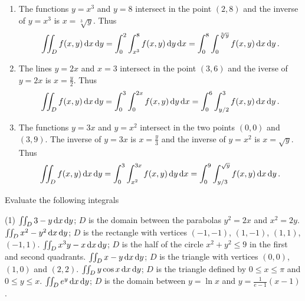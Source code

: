\begin{solution}
\begin{enumerate}
\item
The functions $y=x^3$ and $y=8$ intersect in the point $(2,8)$ and the inverse of $y=x^3$ is $x=\sqrt[3]{y}$. Thus
\[
\iint_D f(x,y) \,\mathrm{d} x \,\mathrm{d} y
= \int_0^2 \int_{x^3}^8 f(x,y) \,\mathrm{d} y \,\mathrm{d} x
= \int_0^8 \int_0^{\sqrt[3]{y}} f(x,y) \,\mathrm{d} x \,\mathrm{d} y\,.
\]
\item
The lines $y=2x$ and $x=3$ intersect in the point $(3,6)$ and the iverse of $y=2x$ is $x=\frac y2$. Thus
\[
\iint_D f(x,y) \,\mathrm{d} x \,\mathrm{d} y
= \int_0^3 \int_0^{2x} f(x,y) \,\mathrm{d} y \,\mathrm{d} x
= \int_0^6 \int_{y/2}^3 f(x,y) \,\mathrm{d} x \,\mathrm{d} y\,.
\]
\item
The functions $y=3x$ and $y=x^2$ intersect in the two points $(0,0)$ and $(3,9)$. The inverse of $y=3x$ is $x=\frac y3$ and the inverse of $y=x^2$ is $x=\sqrt y$. Thus
\[
\iint_D f(x,y) \,\mathrm{d} x \,\mathrm{d} y
= \int_0^3 \int_{x^2}^{3x} f(x,y) \,\mathrm{d} y \,\mathrm{d} x
= \int_0^9 \int_{y/3}^{\sqrt y} f(x,y) \,\mathrm{d} x \,\mathrm{d} y\,.
\]
\end{enumerate}
\end{solution}

\begin{question}
Evaluate the following integrals
\begin{tasks}(1)
\task
$\iint_D 3-y \,\mathrm{d} x \,\mathrm{d} y$; $D$ is the domain between the parabolas $y^2=2x$ and $x^2=2y$.
\task
$\iint_D x^2-y^2 \,\mathrm{d} x \,\mathrm{d} y$; $D$ is the rectangle with vertices $(-1,-1)$, $(1,-1)$, $(1,1)$, $(-1,1)$.
\task
$\iint_D x^3y - x \,\mathrm{d} x \,\mathrm{d} y$; $D$ is the half of the circle $x^2 + y^2 \leq 9$ in the first and second quadrants.
\task
$\iint_D x-y \,\mathrm{d} x \,\mathrm{d} y$; $D$ is the triangle with vertices $(0,0)$, $(1,0)$ and $(2,2)$.
\task
$\iint_D y \cos x \,\mathrm{d} x \,\mathrm{d} y$; $D$ is the triangle defined by $0 \leq x \leq \pi$ and $0 \leq y \leq x$.
\task
\difficulty{*}
$\iint_D e^y \,\mathrm{d} x \,\mathrm{d} y$; $D$ is the domain between $y=\ln x$ and $y = \frac{1}{e-1}(x-1)$.
\end{tasks}
\end{question}

